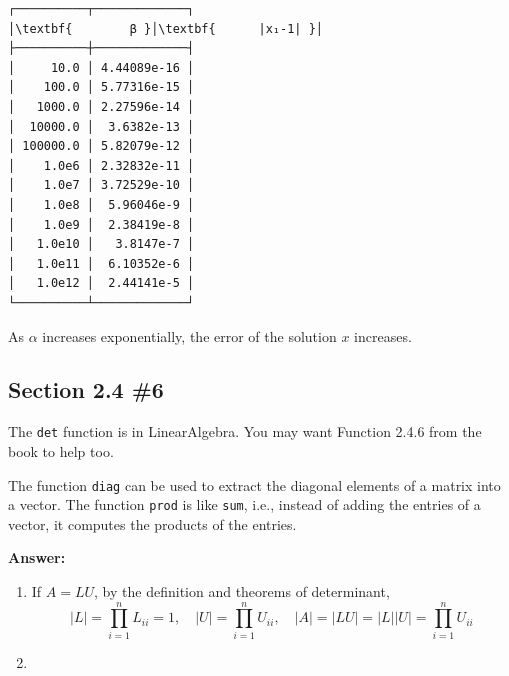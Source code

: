 \documentclass[11pt]{article}
\begin{document}
    \begin{Verbatim}[commandchars=\\\{\}]
┌──────────┬─────────────┐
│\textbf{        β }│\textbf{      |x₁-1| }│
├──────────┼─────────────┤
│     10.0 │ 4.44089e-16 │
│    100.0 │ 5.77316e-15 │
│   1000.0 │ 2.27596e-14 │
│  10000.0 │  3.6382e-13 │
│ 100000.0 │ 5.82079e-12 │
│    1.0e6 │ 2.32832e-11 │
│    1.0e7 │ 3.72529e-10 │
│    1.0e8 │  5.96046e-9 │
│    1.0e9 │  2.38419e-8 │
│   1.0e10 │   3.8147e-7 │
│   1.0e11 │  6.10352e-6 │
│   1.0e12 │  2.44141e-5 │
└──────────┴─────────────┘
    \end{Verbatim}

    As \(\alpha\) increases exponentially, the error of the solution \(x\)
increases.

    \hypertarget{section-2.4-6}{%
\subsection{Section 2.4 \#6}\label{section-2.4-6}}

The \texttt{det} function is in LinearAlgebra. You may want Function
2.4.6 from the book to help too.

The function \texttt{diag} can be used to extract the diagonal elements
of a matrix into a vector. The function \texttt{prod} is like
\texttt{sum}, i.e., instead of adding the entries of a vector, it
computes the products of the entries.

    \textbf{Answer:}

\begin{enumerate}
\def\labelenumi{(\alph{enumi})}
\item
  If \(A=LU\), by the definition and theorems of determinant,
  \[|L|=\prod_{i=1}^n L_{ii}=1,\quad |U|=\prod_{i=1}^n U_{ii}, \quad |A|=|LU|=|L||U|=\prod_{i=1}^n U_{ii}\]
\item
\end{enumerate}
\end{document}
